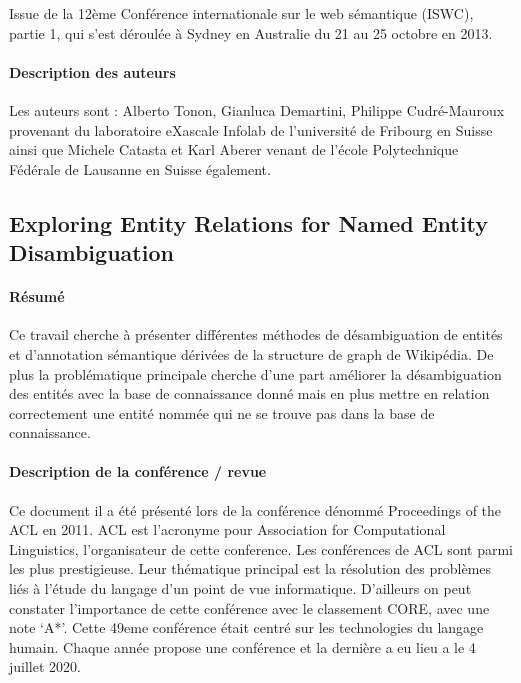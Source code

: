 \documentclass{article}
\begin{document}
Issue de la 12ème Conférence internationale sur le web sémantique (ISWC), partie 1, qui s’est déroulée à Sydney en Australie du 21 au 25 octobre en 2013.


\paragraph{Description des auteurs}

Les auteurs sont :
Alberto Tonon, Gianluca Demartini, Philippe Cudré-Mauroux provenant du laboratoire eXascale Infolab de l'université de Fribourg en Suisse ainsi que Michele Catasta et Karl Aberer venant de l'école Polytechnique Fédérale de Lausanne en Suisse également.

\subsection{Exploring Entity Relations for Named Entity Disambiguation \cite{article-13}}

\paragraph{Résumé}
Ce travail cherche à présenter différentes méthodes de désambiguation de entités et d’annotation sémantique dérivées de la structure de graph de Wikipédia. De plus la problématique principale cherche d’une part améliorer la désambiguation des entités avec la base de connaissance donné mais en plus mettre en relation correctement une entité nommée qui ne se trouve pas dans la base de connaissance.


\paragraph{Description de la conférence / revue}
Ce document il a été présenté lors de la conférence dénommé Proceedings of the ACL en 2011. ACL est l’acronyme pour Association for Computational Linguistics, l’organisateur de cette conference.
Les conférences de ACL sont parmi les plus prestigieuse. Leur thématique principal est la résolution des problèmes liés à l’étude du langage d’un point de vue informatique. 
D’ailleurs on peut constater l’importance de cette conférence avec le classement CORE, avec une note ‘A*’.
Cette 49eme conférence était centré sur les technologies du langage humain. Chaque année propose une conférence et la dernière a eu lieu a le 4 juillet 2020.
\end{document}
